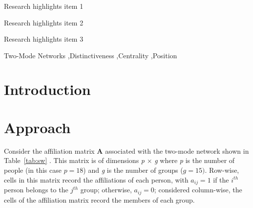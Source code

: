 \documentclass[a4paper,fleqn]{cas-sc}
\begin{document}
\begin{abstract}
This template helps you to create a properly formatted \LaTeX\ manuscript.

\noindent\texttt{\textbackslash begin{abstract}} \dots 
\texttt{\textbackslash end{abstract}} and
\verb+\begin{keyword}+ \verb+...+ \verb+\end{keyword}+ 
which
contain the abstract and keywords respectively. 

\noindent Each keyword shall be separated by a \verb+\sep+ command.
\end{abstract}


\begin{highlights}
\item Research highlights item 1
\item Research highlights item 2
\item Research highlights item 3
\end{highlights}

\begin{keywords}
Two-Mode Networks  \sep Distinctiveness \sep Centrality \sep Position
\end{keywords}


\maketitle

\section{Introduction}



\section{Approach}
Consider the affiliation matrix $\mathbf{A}$ associated with the two-mode network shown in Table~\ref{tab:sw} \citep{davis1941}. This matrix is of dimensions \textit{p} $\times$ \textit{g} where \textit{p} is the number of people (in this case $p = 18$) and \textit{g} is the number of groups ($g = 15)$. Row-wise, cells in this matrix record the affiliations of each person, with $a_{ij} = 1$ if the $i^{th}$ person belongs to the $j^{th}$ group; otherwise, $a_{ij} = 0$; considered column-wise, the cells of the affiliation matrix record the members of each group. 
\end{document}

